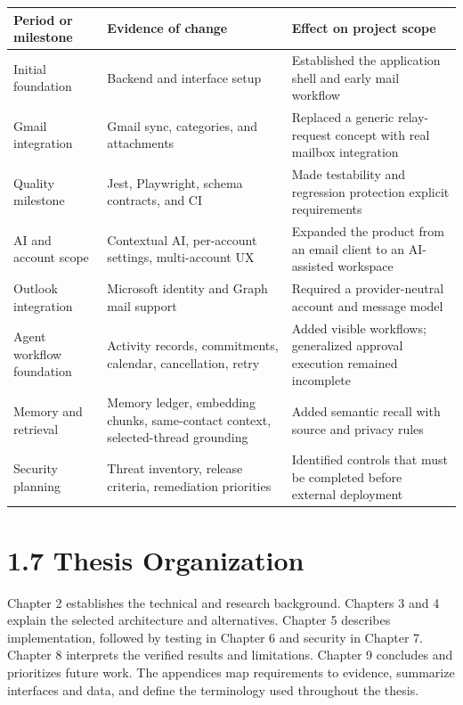 \documentclass[
]{report}
\begin{document}
\begin{longtable}[]{@{}p{}p{}p{}@{}}
\toprule\noalign{}
Period or milestone & Evidence of change & Effect on project scope \\
\midrule\noalign{}
\endhead
\bottomrule\noalign{}
\endlastfoot
Initial foundation & Backend and interface setup & Established the
application shell and early mail workflow \\
Gmail integration & Gmail sync, categories, and attachments & Replaced a
generic relay-request concept with real mailbox integration \\
Quality milestone & Jest, Playwright, schema contracts, and CI & Made
testability and regression protection explicit requirements \\
AI and account scope & Contextual AI, per-account settings,
multi-account UX & Expanded the product from an email client to an
AI-assisted workspace \\
Outlook integration & Microsoft identity and Graph mail support &
Required a provider-neutral account and message model \\
Agent workflow foundation & Activity records, commitments, calendar,
cancellation, retry & Added visible workflows; generalized approval
execution remained incomplete \\
Memory and retrieval & Memory ledger, embedding chunks, same-contact
context, selected-thread grounding & Added semantic recall with source
and privacy rules \\
Security planning & Threat inventory, release criteria, remediation
priorities & Identified controls that must be completed before external
deployment \\
\end{longtable}

\section{1.7 Thesis Organization}\label{17-thesis-organization}

Chapter 2 establishes the technical and research background. Chapters 3
and 4 explain the selected architecture and alternatives. Chapter 5
describes implementation, followed by testing in Chapter 6 and security
in Chapter 7. Chapter 8 interprets the verified results and limitations.
Chapter 9 concludes and prioritizes future work. The appendices map
requirements to evidence, summarize interfaces and data, and define the
terminology used throughout the thesis.
\end{document}
